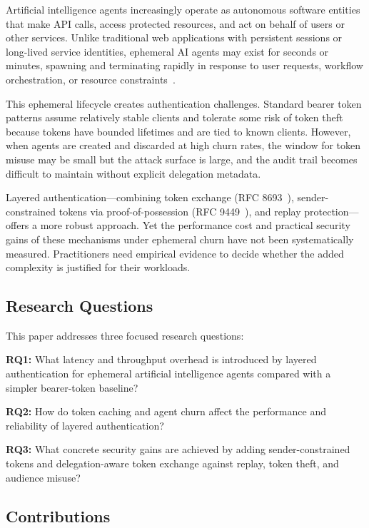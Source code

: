 \documentclass[conference,10pt]{IEEEtran}
\begin{document}
Artificial intelligence agents increasingly operate as autonomous software entities that make API calls, access protected resources, and act on behalf of users or other services. Unlike traditional web applications with persistent sessions or long-lived service identities, ephemeral AI agents may exist for seconds or minutes, spawning and terminating rapidly in response to user requests, workflow orchestration, or resource constraints~\cite{authenticated_delegation_agents}.

This ephemeral lifecycle creates authentication challenges. Standard bearer token patterns assume relatively stable clients and tolerate some risk of token theft because tokens have bounded lifetimes and are tied to known clients. However, when agents are created and discarded at high churn rates, the window for token misuse may be small but the attack surface is large, and the audit trail becomes difficult to maintain without explicit delegation metadata.

Layered authentication---combining token exchange (RFC 8693~\cite{rfc8693}), sender-constrained tokens via proof-of-possession (RFC 9449~\cite{rfc9449}), and replay protection---offers a more robust approach. Yet the performance cost and practical security gains of these mechanisms under ephemeral churn have not been systematically measured. Practitioners need empirical evidence to decide whether the added complexity is justified for their workloads.

\subsection{Research Questions}

This paper addresses three focused research questions:

\textbf{RQ1:} What latency and throughput overhead is introduced by layered authentication for ephemeral artificial intelligence agents compared with a simpler bearer-token baseline?

\textbf{RQ2:} How do token caching and agent churn affect the performance and reliability of layered authentication?

\textbf{RQ3:} What concrete security gains are achieved by adding sender-constrained tokens and delegation-aware token exchange against replay, token theft, and audience misuse?

\subsection{Contributions}
\end{document}
